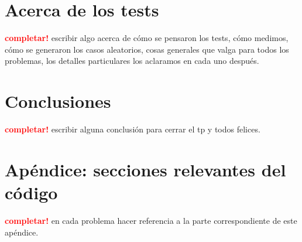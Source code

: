 \documentclass[a4paper]{article}
\begin{document}
\newpage
\section{Acerca de los tests}
    \textcolor{red}{\textbf{completar!}} \medskip
    escribir algo acerca de cómo se pensaron los tests, cómo medimos, cómo se generaron los casos aleatorios, 
    cosas generales que valga para todos los problemas, los detalles particulares los aclaramos en cada uno después.

\newpage

\section{Conclusiones}
    \textcolor{red}{\textbf{completar!}} \medskip
    escribir alguna conclusión para cerrar el tp y todos felices.

\newpage

\section{Apéndice: secciones relevantes del código}
    \textcolor{red}{\textbf{completar!}} \medskip
    en cada problema hacer referencia a la parte correspondiente de este apéndice.
\end{document}
